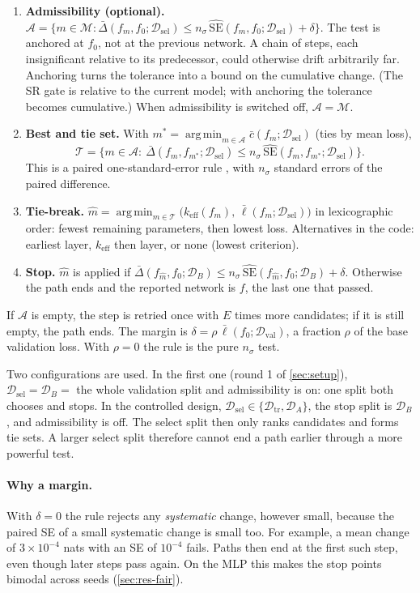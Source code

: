 \documentclass[11pt,a4paper]{article}
\theoremstyle{definition}
\newcommand{\D}{\mathcal{D}}
\DeclareMathOperator*{\argmin}{arg\,min}
\newcommand{\keff}{k_{\mathrm{eff}}}
\newcommand{\Dtr}{\D_{\mathrm{tr}}}
\newcommand{\Dsel}{\D_{\mathrm{sel}}}
\newcommand{\DA}{\D_{A}}
\newcommand{\DB}{\D_{B}}
\newcommand{\Mv}{\mathcal{M}}
\newcommand{\dbar}{\bar{\Delta}}
\newcommand{\sehat}{\widehat{\mathrm{SE}}}
\begin{document}
\begin{enumerate}[label=\textbf{D\arabic*.}]
\item \textbf{Admissibility (optional).}
$\mathcal{A}=\{m\in\Mv:\dbar(f_m,f_0;\Dsel)\le n_\sigma\,\sehat(f_m,f_0;\Dsel)+\delta\}$.
The test is anchored at $f_0$, not at the previous network. A chain of steps, each
insignificant relative to its predecessor, could otherwise drift arbitrarily far.
Anchoring turns the tolerance into a bound on the cumulative change. (The SR gate is
relative to the current model; with anchoring the tolerance becomes cumulative.) When
admissibility is switched off, $\mathcal{A}=\Mv$.
\item \textbf{Best and tie set.} With
$m^\ast=\argmin_{m\in\mathcal{A}}\bar c(f_m;\Dsel)$ (ties by mean loss),
\[
\mathcal{T}=\big\{m\in\mathcal{A}:\ \dbar(f_m,f_{m^\ast};\Dsel)\le n_\sigma\,\sehat(f_m,f_{m^\ast};\Dsel)\big\}.
\]
This is a paired one-standard-error rule \citep{breiman1984classification}, with
$n_\sigma$ standard errors of the paired difference.
\item \textbf{Tie-break.} $\hat m=\argmin_{m\in\mathcal{T}}\big(\keff(f_m),\,\bar\ell(f_m;\Dsel)\big)$
in lexicographic order: fewest remaining parameters, then lowest loss. Alternatives in
the code: earliest layer, $\keff$ then layer, or none (lowest criterion).
\item \textbf{Stop.} $\hat m$ is applied if
$\dbar(f_{\hat m},f_0;\DB)\le n_\sigma\,\sehat(f_{\hat m},f_0;\DB)+\delta$. Otherwise
the path ends and the reported network is $f$, the last one that passed.
\end{enumerate}
If $\mathcal{A}$ is empty, the step is retried once with $E$ times more candidates;
if it is still empty, the path ends. The margin is $\delta=\rho\,\bar\ell(f_0;\D_{\mathrm{val}})$,
a fraction $\rho$ of the base validation loss. With $\rho=0$ the rule is the pure
$n_\sigma$ test.

Two configurations are used. In the first one (round 1 of \cref{sec:setup}),
$\Dsel=\DB=$ the whole validation split and admissibility is on: one split both chooses
and stops. In the controlled design, $\Dsel\in\{\Dtr,\DA\}$, the stop split is $\DB$,
and admissibility is off. The select split then only ranks candidates and forms tie
sets. A larger select split therefore cannot end a path earlier through a more
powerful test.

\paragraph{Why a margin.} With $\delta=0$ the rule rejects any \emph{systematic}
change, however small, because the paired SE of a small systematic change is small too.
For example, a mean change of $3\times10^{-4}$ nats with an SE of $10^{-4}$ fails. Paths
then end at the first such step, even though later steps pass again. On the MLP this
makes the stop points bimodal across seeds (\cref{sec:res-fair}).
\end{document}
